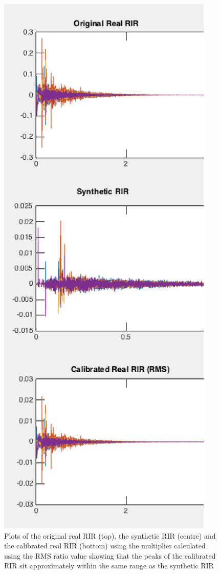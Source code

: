 \documentclass[../../main.tex]{subfiles}
\begin{document}
	\begin{figure}[H]
		\begin{center}
			\includegraphics[scale = 0.3]{Sections/Implementation/RealRIRs/images/calibration/CalRMS_RIR_edit2.png} 
			\caption{Plots of the original real \ac{RIR} (top), the synthetic \ac{RIR} (centre) and the calibrated real \ac{RIR} (bottom) using the multiplier calculated using the RMS ratio value showing that the peaks of the calibrated \ac{RIR} sit approximately within the same range as the synthetic \ac{RIR}}
			\label{calRMS}
		\end{center}
	\end{figure}
\end{document}
